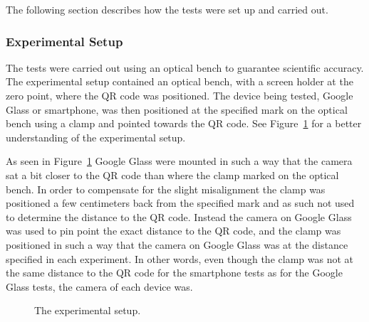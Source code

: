 The following section describes how the tests were set up and carried out.

\subsubsection{Experimental Setup}
The tests were carried out using an optical bench to guarantee scientific accuracy. The experimental setup contained an optical bench, with a screen holder at the zero point, where the QR code was positioned. The device being tested, Google Glass or smartphone, was then positioned at the specified mark on the optical bench using a clamp and pointed towards the QR code. See Figure~\ref{experimentalSetup} for a better understanding of the experimental setup. 

As seen in Figure~\ref{experimentalSetup} Google Glass were mounted in such a way that the camera sat a bit closer to the QR code than where the clamp marked on the optical bench. In order to compensate for the slight misalignment the clamp was positioned a few centimeters back from the specified mark and as such not used to determine the distance to the QR code. Instead the camera on Google Glass was used to pin point the exact distance to the QR code, and the clamp was positioned in such a way that the camera on Google Glass was at the distance specified in each experiment. In other words, even though the clamp was not at the same distance to the QR code for the smartphone tests as for the Google Glass tests, the camera of each device was.

	\begin{figure}[H]%
		\centering
   		 \qquad
   		 \qquad
		\caption{The experimental setup.}
		\label{experimentalSetup}
	\end{figure}


